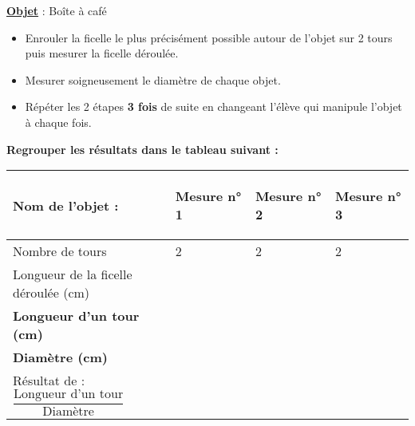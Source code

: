 \documentclass[a4paper,11pt]{article}
\newcommand{\bi}{\begin{itemize}}
\newcommand{\ei}{\end{itemize}}
\begin{document}
{\large \textbf{\underline{Objet}} : Boîte à café }\\

\bi

\item Enrouler la ficelle le plus précisément possible autour de l'objet sur 2 tours puis mesurer la ficelle déroulée.\\


\item Mesurer soigneusement le diamètre de chaque objet.\\

\item Répéter les 2 étapes \textbf{3 fois} de suite en changeant l'élève  qui manipule l'objet à chaque fois.\\


\ei

\textbf{Regrouper les résultats dans le tableau suivant : }

\renewcommand{\arraystretch}{2.2}

\begin{flushleft}
\begin{tabular}{|m{7cm}|m{3.5cm}|m{3.5cm}|m{3.5cm}|}
\hline 
\begin{center}
 \textbf{Nom de l'objet :}
 \end{center} & \begin{center}
\textbf{ Mesure n° 1}
 \end{center}  & \begin{center}
\textbf{ Mesure n° 2}
 \end{center} &  \begin{center}
\textbf{Mesure n° 3}
 \end{center}   \\ 
\hline 
Nombre de tours& 2 & 2 &  2   \\ 
\hline 
Longueur de la ficelle déroulée (cm) &  &   &    \\ 
\hline 
\textbf{Longueur d'un tour (cm)}&  &  &    \\ 
\hline 
\textbf{Diamètre (cm)} &  &  &     \\ 
\hline
Résultat de : \hspace*{0.75cm}$\dfrac{\text{Longueur d'un tour}}{\text{Diamètre}}$ &  &  &     \\ 
\hline
\end{tabular} 
\end{flushleft}
\vspace*{0.5cm}


\vspace*{1cm}
\end{document}
